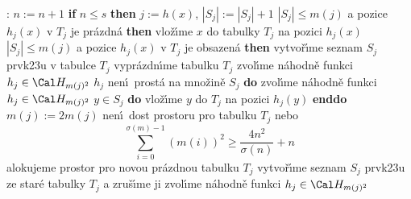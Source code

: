 \documentclass[a4paper,12pt]{article}
\begin{document}
: \newline 
$n:=n+1$ \newline 
{\bf if} $n\le s$ {\bf then}\newline 
\phantom{---}$j:=h(x)$, $|S_j|:=|S_j|+1$\newline 
\phantom{---}{\bf if} $|S_j|\le m(j)$ a pozice $h_j(x)$ v $T_j$ je pr\'azdn\'a {\bf then}\newline 
\phantom{------}vlo\v z\'\i me $x$ do tabulky $T_j$  na pozici $
h_j(x)$\newline 
\phantom{---}{\bf else}\newline 
\phantom{------}{\bf if} $|S_j|\le m(j)$ a pozice $h_j(x)$ v $T_
j$ je obsazen\'a {\bf then}\newline 
\phantom{---------}vytvo\v r\'\i me seznam $S_j$ prvk\accent23u v tabulce $
T_j$\newline 
\phantom{---------}vypr\'azdn\'\i me tabulku $T_j$\newline 
\phantom{---------}zvol\'\i me n\'ahodn\v e funkci $h_j\in \Cal H_{
m(j)^2}$\newline 
\phantom{---------}{\bf while} $h_j$ nen\'\i\ prost\'a na mno\v zin\v e $
S_j$ {\bf do}\newline 
\phantom{------------}zvol\'\i me n\'ahodn\v e funkci $h_j
\in \Cal H_{m(j)^2}$\newline 
\phantom{---------}{\bf enddo}\newline 
\phantom{---------}{\bf for every} $y\in S_j$ {\bf do} vlo\v z\'\i me $
y$ do $T_j$ na pozici $h_j(y)$ {\bf enddo}\newline 
\phantom{------}{\bf else}\newline 
\phantom{---------}$m(j):=2m(j)$\newline 
\phantom{---------}{\bf if} nen\'\i\ dost prostoru pro tabulku $
T_j$ nebo 
$$\sum_{i=0}^{\sigma (m)-1}(m(i))^2\ge\frac {4n^2}{\sigma (n)}+n$$
\phantom{---------}{\bf then}\newline 
\phantom{------------}{\bf RehashAll}\newline 
\phantom{---------}{\bf else}\newline 
\phantom{------------}alokujeme prostor pro novou pr\'azdnou tabulku $
T_j$ \newline 
\phantom{------------}vytvo\v r\'\i me seznam $S_j$ prvk\accent23u ze star\'e tabulky $
T_j$ a zru\v s\'\i me ji\newline 
\phantom{------------}zvol\'\i me n\'ahodn\v e funkci $h_j\in \Cal H_{
m(j)^2}$\newline 
\end{document}
